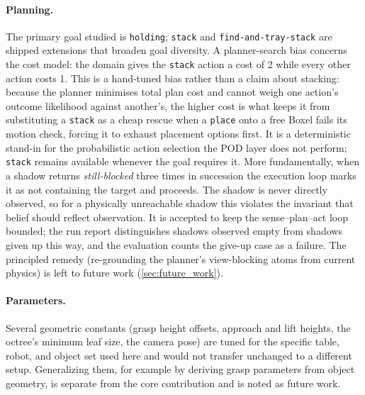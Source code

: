 \paragraph{Planning.} The primary goal studied is \texttt{holding};
\texttt{stack} and \texttt{find-and-tray-stack} are shipped extensions that
broaden goal diversity. A planner-search
bias concerns the cost model: the domain gives the \texttt{stack} action a cost
of 2 while every other action costs 1. This is a hand-tuned bias rather than a
claim about stacking: because the planner minimises total plan cost and cannot
weigh one action's outcome likelihood against another's, the higher cost is what
keeps it from substituting a \texttt{stack} as a cheap rescue when a \texttt{place}
onto a free Boxel fails its motion check, forcing it to exhaust placement options
first. It is a deterministic stand-in for the probabilistic action selection the
POD layer does not perform; \texttt{stack} remains available whenever the goal
requires it. More fundamentally, when a
shadow returns \emph{still-blocked} three times in succession the execution
loop marks it as not containing the target and proceeds. The shadow is
never directly observed, so for a physically unreachable shadow this
violates the invariant that belief should reflect observation. It is
accepted to keep the sense--plan--act loop bounded; the run report
distinguishes shadows observed empty from shadows given up this way, and
the evaluation counts the give-up case as a failure. The principled
remedy (re-grounding the planner's view-blocking atoms from current
physics) is left to future work (\cref{sec:future_work}).

\paragraph{Parameters.} Several geometric constants (grasp height
offsets, approach and lift heights, the octree's minimum leaf size, the
camera pose) are tuned for the specific table, robot, and object set
used here and would not transfer unchanged to a different setup.
Generalizing them, for example by deriving grasp parameters from object
geometry, is separate from the core contribution and is noted as future
work.


